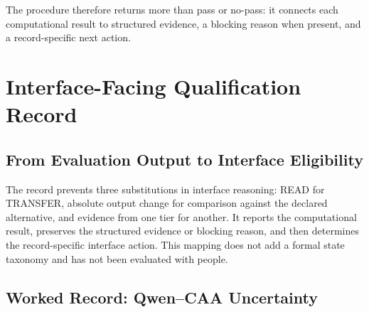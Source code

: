\documentclass[manuscript,review,anonymous]{acmart}
\begin{document}


The procedure therefore returns more than pass or no-pass: it connects each computational result to structured evidence, a blocking reason when present, and a record-specific next action. {}%

\section{Interface-Facing Qualification Record}\label{interface-facing-qualification-record}

\subsection{From Evaluation Output to Interface Eligibility}\label{from-evaluation-output-to-interface-eligibility}

The record prevents three substitutions in interface reasoning: READ for TRANSFER, absolute output change for comparison against the declared alternative, and evidence from one tier for another. It reports the computational result, preserves the structured evidence or blocking reason, and then determines the record-specific interface action. This mapping does not add a formal state taxonomy and has not been evaluated with people.

\subsection{Worked Record: Qwen--CAA Uncertainty}\label{worked-record-qwencaa-uncertainty}
\end{document}
